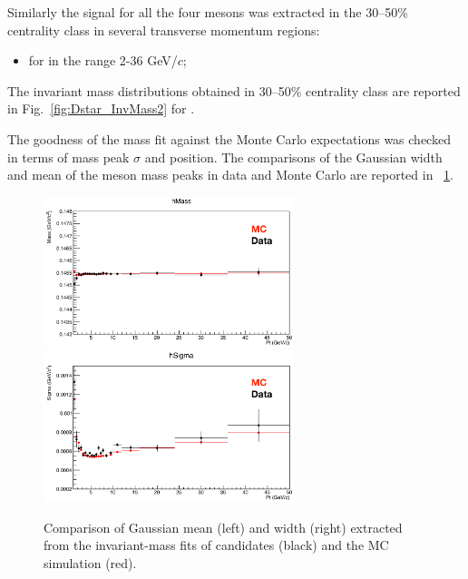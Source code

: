 Similarly the signal for all the four mesons was extracted in the 30--50$\%$ centrality class in several transverse momentum regions: 
\begin{itemize}
	\item for \Dstar in the range 2-36 GeV/$c$;
\end{itemize} 

The invariant mass distributions obtained in 30--50$\%$ centrality class are reported in Fig.~\ref{fig:Dstar_InvMass2} for \Dstar.




The goodness of the mass fit against the Monte
Carlo expectations was checked in terms of mass peak $\sigma$ and position.
The comparisons of the Gaussian width and mean of the \Dstar meson mass peaks in data and Monte Carlo are reported in ~\ref{fig:Dstar_Mean_width}.



\begin{figure}[tb]
\begin{center}
 \includegraphics[width=0.65\textwidth]{figures/Dstar/pp13TeV/DstarMean-position.png}
 \includegraphics[width=0.65\textwidth]{figures/Dstar/pp13TeV/DstarWidth_sigma.png}
\caption{Comparison of Gaussian mean (left) and width (right) extracted from the invariant-mass fits of \Dstar candidates (black) and the MC simulation (red).}
\label{fig:Dstar_Mean_width}
\end{center}
\end{figure}


